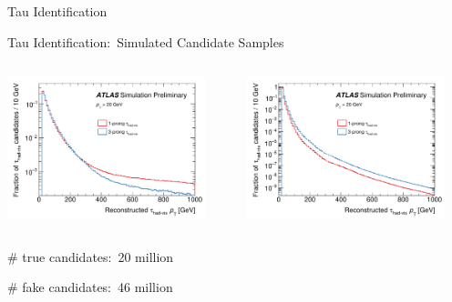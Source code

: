 \documentclass[11pt, xcolor={dvipsnames}, aspectratio=169]{beamer}
\begin{document}

\begin{frame}[standout]
  Tau Identification
\end{frame}


\begin{frame}{Tau Identification:\ Simulated \tauhadvis Candidate Samples}
  \begin{columns}
    \centering\footnotesize

    \allbold{$\gamma^* \to \tau^+\tau^-$}

    \includegraphics[width=0.9\textwidth]{tauid/pubnote/taupt_gammastar}

    \centering\footnotesize


    \includegraphics[width=0.9\textwidth]{tauid/pubnote/taupt_dijet}
  \end{columns}

  \footnotesize

  \# true \tauhadvis candidates:\ 20 million

  \# fake \tauhadvis candidates:\ 46 million
\end{frame}
\end{document}

